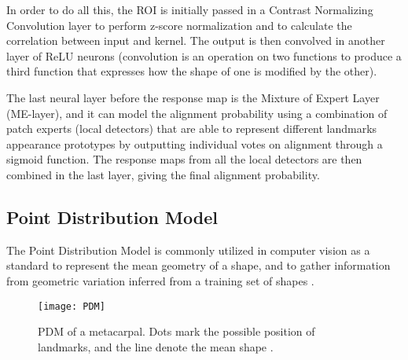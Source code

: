 In order to do all this, the ROI is initially passed in a Contrast Normalizing Convolution layer to perform z-score normalization and to calculate the correlation between input and kernel. The output is then convolved in another layer of ReLU neurons (convolution is an operation on two functions to produce a third function that expresses how the shape of one is modified by the other).

The last neural layer before the response map is the Mixture of Expert Layer (ME-layer), and it can model the alignment probability using a combination of patch experts (local detectors) that are able to represent different landmarks appearance prototypes by outputting individual votes on alignment through a sigmoid function. The response maps from all the local detectors are then combined in the last layer, giving the final alignment probability.

\subsection{Point Distribution Model}
The Point Distribution Model is commonly utilized in computer vision as a standard to represent the mean geometry of a shape, and to gather information from geometric variation inferred from a training set of shapes \cite{wiki:PDM}. 

\begin{figure}[H]
	\centering
	\texttt{[image: PDM]}
	\caption{PDM of a metacarpal. Dots mark the possible position of landmarks, and the line denote the mean shape \cite{PDM}.}
	\label{fig:PDM}
\end{figure}

